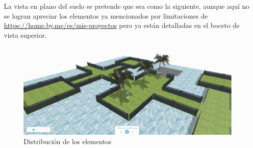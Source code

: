 \documentclass[12pt]{article} %
\begin{document}
		\newpage
		\begin{landscape}
		\setlength{\parindent}{1.0cm}
		La vista en plano del suelo se pretende que sea como la siguiente, aunque aquí no se logran apreciar los elementos ya mencionados por limitaciones de \color{blue}\url{https://home.by.me/es/mis-proyectos}\color{black} pero ya están detalladas en el boceto de vista superior.
		\setlength{\parindent}{0.0cm}
		\begin{figure}[h]
			\begin{center}
				\includegraphics[scale=0.8]{images/vista.png}
				\caption{Distribución de los elementos}
			\end{center}		
		\end{figure}
	\end{landscape}
\end{document}
